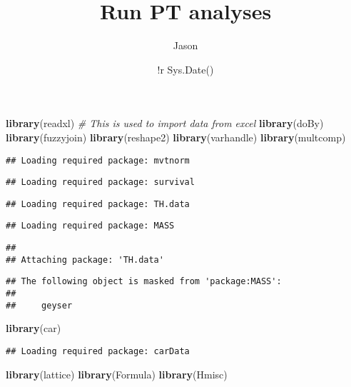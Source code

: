 \documentclass[]{article}
\title{Run PT analyses}
\author{Jason}
\date{!r Sys.Date()}
\newenvironment{Shaded}{\begin{snugshade}}{\end{snugshade}}
\newcommand{\KeywordTok}[1]{\textcolor[rgb]{0.13,0.29,0.53}{\textbf{#1}}}
\newcommand{\CommentTok}[1]{\textcolor[rgb]{0.56,0.35,0.01}{\textit{#1}}}
\newcommand{\NormalTok}[1]{#1}
\begin{document}
\maketitle

\begin{Shaded}
\begin{Highlighting}[]
\KeywordTok{library}\NormalTok{(readxl) }\CommentTok{# This is used to import data from excel}
\KeywordTok{library}\NormalTok{(doBy)}
\KeywordTok{library}\NormalTok{(fuzzyjoin)}
\KeywordTok{library}\NormalTok{(reshape2)}
\KeywordTok{library}\NormalTok{(varhandle)}
\KeywordTok{library}\NormalTok{(multcomp)}
\end{Highlighting}
\end{Shaded}

\begin{verbatim}
## Loading required package: mvtnorm
\end{verbatim}

\begin{verbatim}
## Loading required package: survival
\end{verbatim}

\begin{verbatim}
## Loading required package: TH.data
\end{verbatim}

\begin{verbatim}
## Loading required package: MASS
\end{verbatim}

\begin{verbatim}
## 
## Attaching package: 'TH.data'
\end{verbatim}

\begin{verbatim}
## The following object is masked from 'package:MASS':
## 
##     geyser
\end{verbatim}

\begin{Shaded}
\begin{Highlighting}[]
\KeywordTok{library}\NormalTok{(car)}
\end{Highlighting}
\end{Shaded}

\begin{verbatim}
## Loading required package: carData
\end{verbatim}

\begin{Shaded}
\begin{Highlighting}[]
\KeywordTok{library}\NormalTok{(lattice)}
\KeywordTok{library}\NormalTok{(Formula)}
\KeywordTok{library}\NormalTok{(Hmisc)}
\end{Highlighting}
\end{Shaded}
\end{document}
